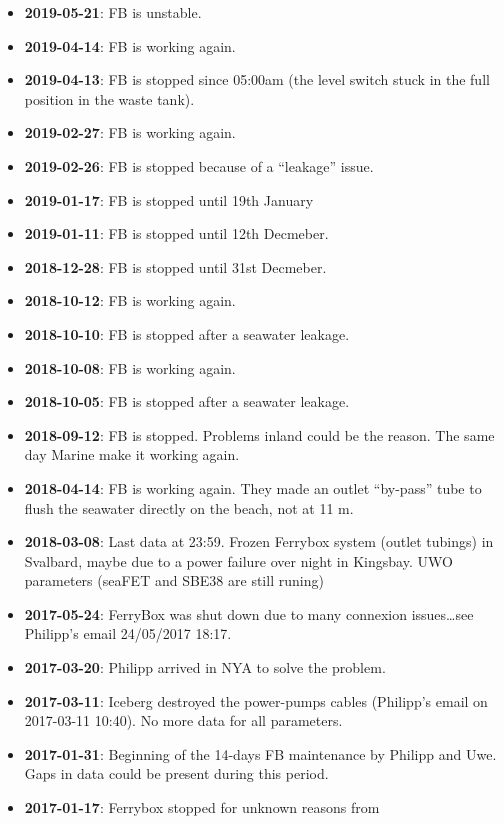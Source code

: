 \documentclass[
]{article}
\begin{document}
\begin{itemize}
\item
  \textbf{2019-05-21}: FB is unstable.
\item
  \textbf{2019-04-14}: FB is working again.
\item
  \textbf{2019-04-13}: FB is stopped since 05:00am (the level switch
  stuck in the full position in the waste tank).
\item
  \textbf{2019-02-27}: FB is working again.
\item
  \textbf{2019-02-26}: FB is stopped because of a ``leakage'' issue.
\item
  \textbf{2019-01-17}: FB is stopped until 19th January
\item
  \textbf{2019-01-11}: FB is stopped until 12th Decmeber.
\item
  \textbf{2018-12-28}: FB is stopped until 31st Decmeber.
\item
  \textbf{2018-10-12}: FB is working again.
\item
  \textbf{2018-10-10}: FB is stopped after a seawater leakage.
\item
  \textbf{2018-10-08}: FB is working again.
\item
  \textbf{2018-10-05}: FB is stopped after a seawater leakage.
\item
  \textbf{2018-09-12}: FB is stopped. Problems inland could be the
  reason. The same day Marine make it working again.
\item
  \textbf{2018-04-14}: FB is working again. They made an outlet
  ``by-pass'' tube to flush the seawater directly on the beach, not at
  11 m.
\item
  \textbf{2018-03-08}: Last data at 23:59. Frozen Ferrybox system
  (outlet tubings) in Svalbard, maybe due to a power failure over night
  in Kingsbay. UWO parameters (seaFET and SBE38 are still runing)
\item
  \textbf{2017-05-24}: FerryBox was shut down due to many connexion
  issues\ldots see Philipp's email 24/05/2017 18:17.
\item
  \textbf{2017-03-20}: Philipp arrived in NYA to solve the problem.
\item
  \textbf{2017-03-11}: Iceberg destroyed the power-pumps cables
  (Philipp's email on 2017-03-11 10:40). No more data for all
  parameters.
\item
  \textbf{2017-01-31}: Beginning of the 14-days FB maintenance by
  Philipp and Uwe. Gaps in data could be present during this period.
\item
  \textbf{2017-01-17}: Ferrybox stopped for unknown reasons from

\end{itemize}
\end{document}
